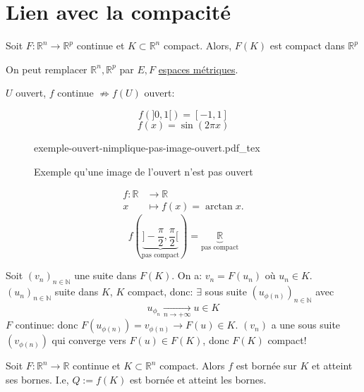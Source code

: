 \documentclass[a4paper]{report}
\newcommand\N{\ensuremath{\mathbb{N}}}
\newcommand\R{\ensuremath{\mathbb{R}}}
\let\implies\Rightarrow
\theoremstyle{definition}
\newcommand{\incfig}[1]{%
    \def\svgwidth{\columnwidth}
    {#1.pdf_tex}
}
\begin{document}
\section{Lien avec la compacité}
\begin{theorem}
    Soit $F: \R^n \to \R^p$ continue et $K \subset \R^n$ compact. Alors, $F(K)$ est compact dans  $\R^p$
\end{theorem}
\begin{remark}
    On peut remplacer $\R^n, \R^p$ par $E, F$ \underline{espaces métriques}.
\end{remark}
\begin{remark}
   $U$ ouvert,  $f$ continue $\not\implies f(U)$ ouvert:
\end{remark}
\begin{eg}
   \[
       f(]0, 1[) = [-1, 1]
   \]  
   \[
   f(x) = \sin(2\pi x)
   \] 
\begin{figure}[H]
    \centering
    \incfig{exemple-ouvert-nimplique-pas-image-ouvert}
    \caption{Exemple qu'une image de l'ouvert n'est pas ouvert}
    \label{fig:exemple-ouvert-nimplique-pas-image-ouvert}
\end{figure}
\end{eg}
\begin{eg}
   \begin{align*}
       f: \R &\longrightarrow \R \\
       x &\longmapsto f(x) = \arctan x
   .\end{align*} 
   \[
       f(\underbrace{]-\frac{\pi}{2}, \frac{\pi}{2}[}_{\text{pas compact}}) = \underbrace{\R}_{\text{pas compact}}
   \] 
\end{eg}
\begin{preuve}
    Soit $(v_n)_{n \in \N}$ une suite dans $F(K)$. On a:  $v_n = F(u_n)$ où  $u_n \in K$.  $(u_n)_{n \in \N}$ suite dans $K$,  $K$ compact, donc:  $\exists$ sous suite $(u_{\phi(n)})_{n \in \N}$ avec 
    \[
        u_{\phi_n} \xrightarrow[n \to +\infty]{} u \in K
    \] 
    $F$ continue: donc  $F(u_{\phi(n)}) = v_{\phi(n)} \to F(u) \in K$. $(v_n)$ a une sous suite  $(v_{\phi(n)})$ qui converge vers $F(u) \in F(K)$, donc $F(K)$ compact!
\end{preuve}
\begin{theorem}
    Soit $F: \R^n \to \R$ continue et $K \subset \R^n$ compact. Alors $f$ est bornée sur  $K$ et atteint ses bornes. I.e, $Q := f(K)$ est bornée et atteint les bornes.
\end{theorem}
\end{document}
